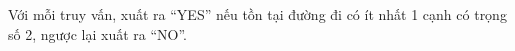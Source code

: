 Với mỗi truy vấn, xuất ra “YES” nếu tồn tại đường đi có ít nhất 1 cạnh có trọng số 2, ngược lại xuất ra “NO”.